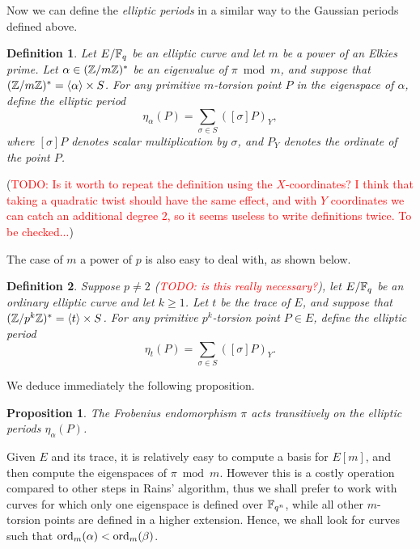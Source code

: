 \documentclass{article}
\newcommand{\todo}[1]{(\textcolor{red}{TODO: #1})}
\newtheorem{Def}{Definition}
\newtheorem{Prop}{Proposition}
\begin{document}
Now we can define the \emph{elliptic periods} in a similar way to the
Gaussian periods defined above.

\begin{Def}
  Let $E/\mathbb{F}_q$ be an elliptic curve and let $m$ be a power of an
  Elkies prime. Let $\alpha\in(\mathbb{Z}/m\mathbb{Z})^\ast$ be an eigenvalue of
  $\pi\bmod m$, and suppose that
  $(\mathbb{Z}/m\mathbb{Z})^\ast=\langle\alpha\rangle\times S$. For any primitive
  $m$-torsion point $P$ in the eigenspace of $\alpha$, define the
  elliptic period
  \begin{equation}
    \eta_\alpha(P) = \sum_{\sigma\in S} ([\sigma]P)_Y,
  \end{equation}
  where $[\sigma]P$ denotes scalar multiplication by $\sigma$, and
  $P_Y$ denotes the ordinate of the point $P$.
\end{Def}

\todo{Is it worth to repeat the definition using the $X$-coordinates?
  I think that taking a quadratic twist should have the same effect,
  and with $Y$ coordinates we can catch an additional degree $2$, so
  it seems useless to write definitions twice. To be checked...}

The case of $m$ a power of $p$ is also easy to deal with, as shown
below.

\begin{Def}
  Suppose $p\ne2$ \todo{is this really necessary?}, let $E/\mathbb{F}_q$ be an
  ordinary elliptic curve and let $k\ge1$. Let $t$ be the trace of
  $E$, and suppose that $(\mathbb{Z}/p^k\mathbb{Z})^\ast=\langle t\rangle\times
  S$. For any primitive $p^k$-torsion point $P\in E$, define the
  elliptic period
  \begin{equation}
    \eta_t(P) = \sum_{\sigma\in S} ([\sigma]P)_Y.
  \end{equation}
\end{Def}

We deduce immediately the following proposition.

\begin{Prop}
  The Frobenius endomorphism $\pi$ acts transitively on the elliptic
  periods $\eta_\alpha(P)$.
\end{Prop}

Given $E$ and its trace, it is relatively easy to compute a basis for
$E[m]$, and then compute the eigenspaces of $\pi\bmod m$. However this
is a costly operation compared to other steps in Rains' algorithm,
thus we shall prefer to work with curves for which only one eigenspace
is defined over $\mathbb{F}_{q^n}$, while all other $m$-torsion points are
defined in a higher extension. Hence, we shall look for curves such
that $\operatorname{ord}_m(\alpha)<\operatorname{ord}_m(\beta)$.
\end{document}
